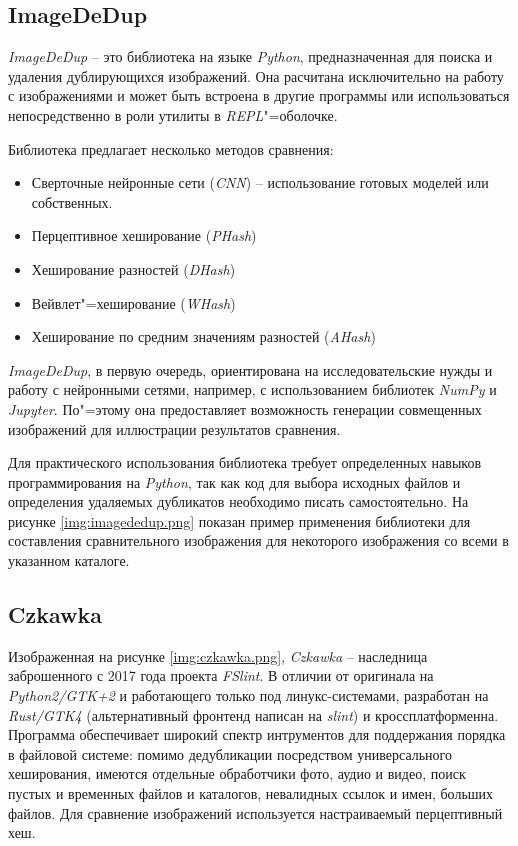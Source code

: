 \documentclass[variant=courcework]{bsuir}
\begin{document}
\subsection{ImageDeDup}
\textit{ImageDeDup} -- это библиотека на языке \textit{Python}, предназначенная
для поиска и удаления дублирующихся изображений. Она расчитана исключительно на
работу с изображениями и может быть встроена в другие программы или
использоваться непосредственно в роли утилиты в \textit{REPL}"=оболочке.

Библиотека предлагает несколько методов сравнения:

\begin{itemize}
\item Сверточные нейронные сети (\textit{CNN}) -- использование готовых моделей
      или собственных.
\item Перцептивное хеширование (\textit{PHash})
\item Хеширование разностей (\textit{DHash})
\item Вейвлет"=хеширование (\textit{WHash})
\item Хеширование по средним значениям разностей (\textit{AHash})
\end{itemize}

\textit{ImageDeDup}, в первую очередь, ориентирована на исследовательские нужды
и работу с нейронными сетями, например, с использованием библиотек
\textit{NumPy} и \textit{Jupyter}. По"=этому она предоставляет возможность
генерации совмещенных изображений для иллюстрации результатов сравнения.

Для практического использования библиотека требует определенных навыков
программирования на \textit{Python}, так как код для выбора исходных файлов и
определения удаляемых дубликатов необходимо писать самостоятельно. На рисунке
\ref{img:imagededup.png} показан пример применения библиотеки для составления
сравнительного изображения для некоторого изображения со всеми в указанном
каталоге.


\subsection{Czkawka}
Изображенная на рисунке \ref{img:czkawka.png}, \textit{Czkawka} -- наследница
заброшенного с 2017 года проекта \textit{FSlint}. В отличии от оригинала на
\textit{Python2/GTK+2} и работающего только под линукс-системами, разработан на
\textit{Rust/GTK4} (альтернативный фронтенд написан на \textit{slint}) и
кроссплатформенна. Программа обеспечивает широкий спектр интрументов для
поддержания порядка в файловой системе: помимо дедубликации посредством
универсального хеширования, имеются отдельные обработчики фото, аудио и видео,
поиск пустых и временных файлов и каталогов, невалидных ссылок и имен, больших
файлов. Для сравнение изображений используется настраиваемый перцептивный хеш.
\end{document}
